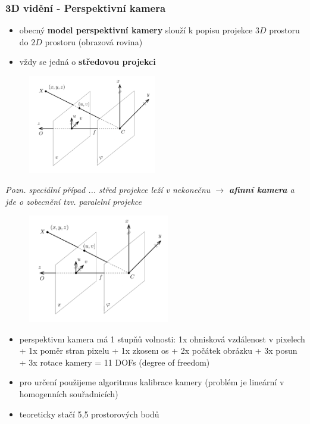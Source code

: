  
\begin{frame}
\frametitle{3D vidění - Perspektivní kamera}

\begin{itemize}
\item obecný \textbf{model perspektivní kamery} slouží k popisu projekce $ 3D $ prostoru do $ 2D $ prostoru (obrazová rovina)
\item vždy se jedná o \textbf{středovou projekci}
\end{itemize}

\begin{figure}[h]
\centering
\includegraphics[width=0.5\textwidth]{./fig01}
\end{figure}
\textit{
Pozn.  speciální případ ... střed projekce leží v nekonečnu $ \rightarrow $ \textbf{afinní kamera} a jde o zobecnění tzv. paralelní projekce}
\end{frame}

\begin{frame}
\begin{figure}[h]
\centering
\includegraphics[width=0.55\textwidth]{./fig01}
\end{figure}

\begin{itemize}
\item perspektivnı kamera má 1 stupňů volnosti: 1x ohnisková
vzdálenost v pixelech + 1x poměr stran pixelu + 1x zkosenı os
+ 2x počátek obrázku + 3x posun + 3x rotace kamery = 11
DOFs (degree of freedom)
\item pro určení použijeme algoritmus kalibrace kamery (problém je lineární v homogenních souřadnicích)
\item teoreticky stačí 5,5 prostorových bodů
\end{itemize}

\end{frame}

